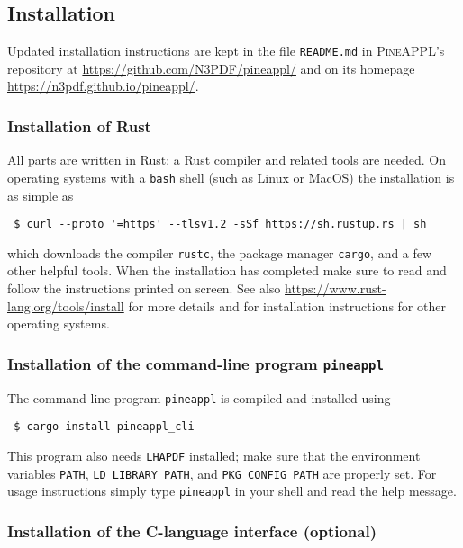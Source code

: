 \subsection{Installation}
\label{app:installation}

Updated installation instructions are kept in the file \texttt{README.md} in \textsc{PineAPPL}'s repository at \url{https://github.com/N3PDF/pineappl/} and on its homepage \url{https://n3pdf.github.io/pineappl/}.

\subsubsection*{Installation of Rust}


All parts are written in Rust: a Rust compiler and related tools are needed.
On operating systems with a \texttt{bash} shell (such as Linux or MacOS) the installation is as simple as
\begin{verbatim}
 $ curl --proto '=https' --tlsv1.2 -sSf https://sh.rustup.rs | sh
\end{verbatim}
which downloads the compiler \texttt{rustc}, the package manager \texttt{cargo}, and a few other helpful tools.
When the installation has completed make sure to read and follow the instructions printed on screen.
See also \url{https://www.rust-lang.org/tools/install} for more details and for installation instructions for other operating systems.

\subsubsection*{Installation of the command-line program \texorpdfstring{\texttt{pineappl}}{pineappl}}

The command-line program \texttt{pineappl} is compiled and installed using
\begin{verbatim}
 $ cargo install pineappl_cli
\end{verbatim}
This program also needs \texttt{LHAPDF} \cite{Buckley:2014ana} installed; make sure that the environment variables \texttt{PATH}, \texttt{LD\_LIBRARY\_PATH}, and \texttt{PKG\_CONFIG\_PATH} are properly set.
For usage instructions simply type \texttt{pineappl} in your shell and read the help message.

\subsubsection*{Installation of the C-language interface (optional)}

